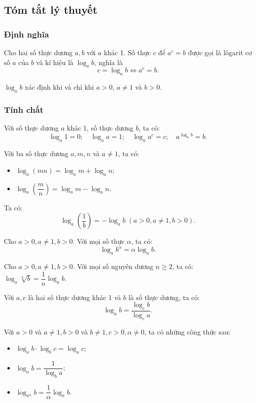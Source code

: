 \subsection{Tóm tắt lý thuyết}
\begin{tomtat}
	\subsubsection{Định nghĩa}
	\begin{dn}
		Cho hai số thực dương $a, b$ với $a$ khác 1. Số thực $c$ để $a^{c}=b$ được gọi là lôgarit cơ số $a$ của $b$ và kí hiệu là $\log _{a} b$, nghĩa là
		$$c=\log _{a} b \Leftrightarrow a^{c}=b.$$
	\end{dn}
	\begin{note}
		$\log _{a} b$ xác định khi và chỉ khi $a>0$, $a \neq 1$ và $b>0$.
	\end{note}
	\subsubsection{Tính chất}
	\begin{tc}
		Với số thực dương $a$ khác 1, số thực dương $b$, ta có:
		$$\log _{a} 1=0 ; \quad \log _{a} a=1 ; \quad \log _{a} a^{c}=c ; \quad a^{\log _{a} b}=b.$$
	\end{tc}
	\begin{tc}
		Với ba số thực dương $a, m, n$ và $a \neq 1$, ta có:
		\begin{itemize}
			\item $\log _{a}(m n)=\log _{a} m+\log _{a} n$;
			\item $\log _{a}\left(\dfrac{m}{n}\right)=\log _{a} m-\log _{a} n$. 
		\end{itemize}
	\end{tc}
	\begin{note}
		Ta có:
		$$\log _{a}\left(\frac{1}{b}\right)=-\log _{a} b\; (a>0, a \neq 1, b>0).$$
	\end{note}
	\begin{tc}
		Cho $a>0, a \neq 1, b>0$. Với mọi số thực $\alpha$, ta có:
		$$	\log _a b^\alpha=\alpha \log _a b.	$$
	\end{tc}
	\begin{note}
		Cho $a>0, a \neq 1, b>0$. Với mọi số nguyên dương $n \geq 2$, ta có: $	\log _a \sqrt[n]{b}=\dfrac{1}{n} \log _a b.$
	\end{note}
	\begin{tc}
		Với $a, c$ là hai số thực dương khác 1 và $b$ là số thực dương, ta có:
		$$\log _{a} b=\dfrac{\log _{c} b}{\log _{c} a}.$$
	\end{tc}
	\begin{nx}
		Với $a>0$ và $a \neq 1, b>0$ và $b \neq 1, c>0, \alpha \neq 0$, ta có những công thức sau:
		\begin{itemize}
			\item $\log _{a} b \cdot \log _{b} c=\log _{a} c$;
			\item $\log _{a} b=\dfrac{1}{\log _{b} a}$;
			\item $\log _{a^{\alpha}} b=\dfrac{1}{\alpha} \log _{a} b$.
		\end{itemize}
	\end{nx}

\end{tomtat}
